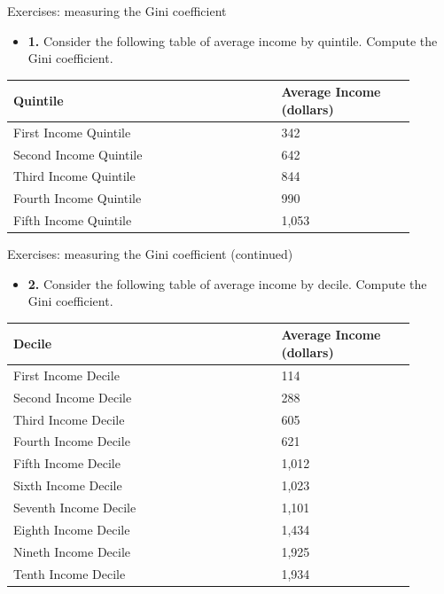 \documentclass[aspectratio=169]{beamer}
\begin{document}
\begin{frame}{Exercises: measuring the Gini coefficient}
\transfade
\begin{itemize}
\item \textbf{1.} Consider the following table of average income by quintile. Compute the Gini coefficient.
\end{itemize}
\begin{center}
\small
\begin{tabular}{p{0.60\linewidth} p{0.30\linewidth}}
\toprule
\textbf{Quintile} & \textbf{Average Income (dollars)} \\
\midrule
First Income Quintile & 342 \\
Second Income Quintile & 642 \\
Third Income Quintile & 844 \\
Fourth Income Quintile & 990 \\
Fifth Income Quintile & 1{,}053 \\
\bottomrule
\end{tabular}
\end{center}
\end{frame}

\begin{frame}{Exercises: measuring the Gini coefficient (continued)}
\transfade
\begin{itemize}
\item \textbf{2.} Consider the following table of average income by decile. Compute the Gini coefficient.
\end{itemize}
\begin{center}
\small
\begin{tabular}{p{0.60\linewidth} p{0.30\linewidth}}
\toprule
\textbf{Decile} & \textbf{Average Income (dollars)} \\
\midrule
First Income Decile & 114 \\
Second Income Decile & 288 \\
Third Income Decile & 605 \\
Fourth Income Decile & 621 \\
Fifth Income Decile & 1{,}012 \\
Sixth Income Decile & 1{,}023 \\
Seventh Income Decile & 1{,}101 \\
Eighth Income Decile & 1{,}434 \\
Nineth Income Decile & 1{,}925 \\
Tenth Income Decile & 1{,}934 \\
\bottomrule
\end{tabular}
\end{center}
\end{frame}
\end{document}
